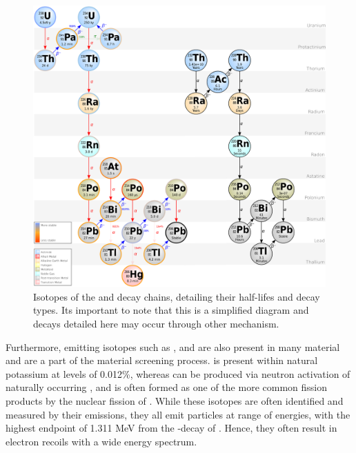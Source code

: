 \begin{figure}[t!]
    \begin{center}
        \includegraphics[scale=0.75]{Chapter_3/Figures/U_Th_Chain.png}
        \caption[Isotopes if the \UTTE{} and \ThTTT{} decay chains, detailing their half-lifes and decay types.]%
        {Isotopes of the \UTTE{} and \ThTTT{} decay chains, detailing their half-lifes and decay types. Its important to note that this is a simplified diagram and decays detailed here may occur through other mechanism.}
        \label{fig:u_238_and_th_232}
    \end{center}
\end{figure}
%


Furthermore, \gray{} emitting isotopes such as \KFZ{}, \CoSZ{} and \CsOTS{} are also present in many material and are a part of the material screening process. \KFZ{} is present within natural potassium at levels of 0.012\%, whereas \CoSZ{} can be produced via neutron activation of naturally occurring \CoFN{}, and \CsOTS{} is often formed as one of the more common fission products by the nuclear fission of \UTTF{}. While these isotopes are often identified and measured by their \gray{} emissions, they all emit \beta particles at range of energies, with the highest endpoint of 1.311 MeV from the \beta-decay of \KFZ{}. Hence, they often result in electron recoils with a wide energy spectrum.

